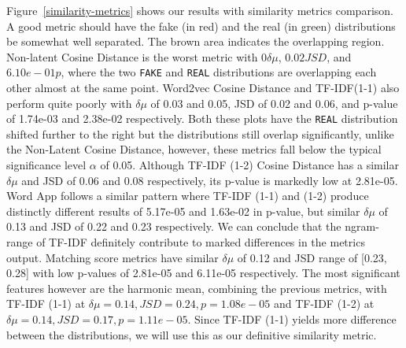 \documentclass{article}
\begin{document}
Figure~\ref{similarity-metrics} shows our results with similarity metrics comparison. A good metric should have the fake (in red) and the real (in green) distributions be somewhat well separated. The brown area indicates the overlapping region. Non-latent Cosine Distance is the worst metric with $0 \delta \mu$, $0.02 JSD$, and $6.10e-01 p$, where the two \texttt{FAKE} and \texttt{REAL} distributions are overlapping each other almost at the same point. Word2vec Cosine Distance and TF-IDF(1-1) also perform quite poorly with $\delta \mu$ of 0.03 and 0.05, JSD of 0.02 and 0.06, and p-value of 1.74e-03 and 2.38e-02 respectively. Both these plots have the \texttt{REAL} distribution shifted further to the right but the distributions still overlap significantly, unlike the Non-Latent Cosine Distance, however, these metrics fall below the typical significance level $\alpha$ of 0.05. Although TF-IDF (1-2) Cosine Distance has a similar $\delta \mu$ and JSD of 0.06 and 0.08 respectively, its p-value is markedly low at 2.81e-05. Word App follows a similar pattern where TF-IDF (1-1) and (1-2) produce distinctly different results of 5.17e-05 and 1.63e-02 in p-value, but similar $\delta \mu$ of 0.13 and JSD of 0.22 and 0.23 respectively. We can conclude that the ngram-range of TF-IDF definitely contribute to marked differences in the metrics output. Matching score metrics have similar $\delta \mu$ of 0.12 and JSD range of [0.23, 0.28] with low p-values of 2.81e-05 and 6.11e-05 respectively. The most significant features however are the harmonic mean, combining the previous metrics, with TF-IDF (1-1) at $\delta \mu = 0.14, JSD = 0.24, p = 1.08e-05$ and TF-IDF (1-2) at $\delta \mu = 0.14, JSD = 0.17, p = 1.11e-05$. Since TF-IDF (1-1) yields more difference between the distributions, we will use this as our definitive similarity metric.

\end{document}
